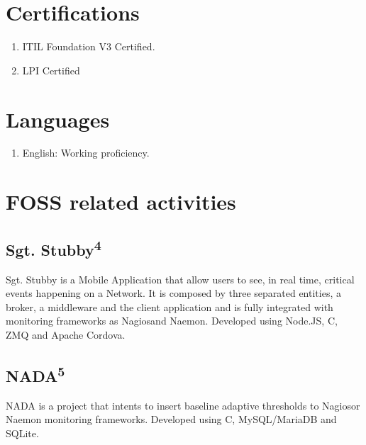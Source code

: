 \documentclass{article}
\begin{document}
\begin{multicols}{2}
\section{Certifications}
\begin{enumerate}
\item ITIL Foundation V3 Certified.
\item LPI Certified
\end{enumerate}

\section{Languages}
\begin{enumerate}
\item English: Working proficiency.
\end{enumerate}

\section{FOSS related activities}

\subsection{Sgt. Stubby\textsuperscript{4}}
Sgt. Stubby is a Mobile Application that allow users to see, in real time,
critical events happening on a Network. It is composed by three separated entities, a
broker, a middleware and the client application and is fully integrated with
monitoring frameworks as Nagios\texttrademark and Naemon. Developed using
Node.JS, C, ZMQ and Apache Cordova.

\subsection{NADA\textsuperscript{5}}
NADA is a project that intents to insert baseline adaptive thresholds to 
Nagios\texttrademark or Naemon monitoring frameworks. Developed using C,
MySQL/MariaDB and SQLite.


\end{multicols}
\end{document}
